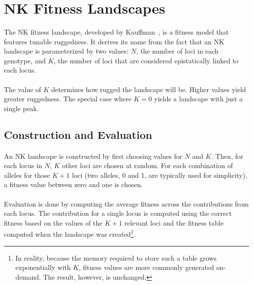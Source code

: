 \documentclass[12pt,letterpaper,titlepage]{article}
\begin{document}
\section{NK Fitness Landscapes}

\paragraph{}
The NK fitness landscape, developed by Kauffman~\cite{Kauffman1993}, is a
fitness model that features tunable ruggedness. It derives its name from the
fact that an NK landscape is parameterized by two values: $N$, the number of
loci in each genotype, and $K$, the number of loci that are considered
epistatically linked to each locus.

\paragraph{}
The value of $K$ determines how rugged the landscape will be. Higher values
yield greater ruggedness. The special case where $K=0$ yields a landscape with
just a single peak.

\subsection{Construction and Evaluation}

\paragraph{}
An NK landscape is constructed by first choosing values for $N$ and $K$. Then,
for each locus in $N$, $K$ other loci are chosen at random. For each
combination of alleles for those $K+1$ loci (two alleles, 0 and 1, are
typically used for simplicity), a fitness value between zero and one is chosen.

\paragraph{}
Evaluation is done by computing the average fitness across the contributions
from each locus. The contribution for a single locus is computed using the
correct fitness based on the values of the $K+1$ relevant loci and the fitness
table computed when the landscape was created\footnote{In reality, because the
memory required to store such a table grows exponentially with $K$, fitness
values are more commonly generated on-demand. The result, however, is
unchanged.}.
\end{document}
